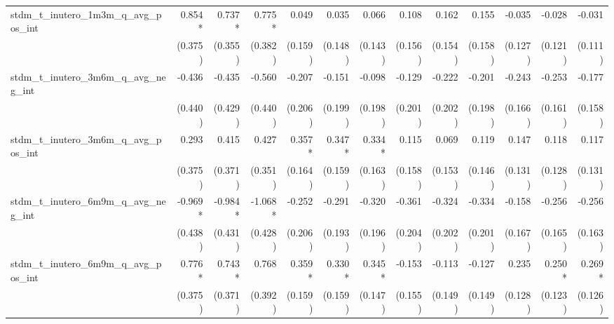 \begin{tabular}{lrrrrrrrrrrrr}
stdm\_t\_inutero\_1m3m\_q\_avg\_pos\_int    &       0.854* &       0.737* &       0.775* &        0.049 &        0.035 &        0.066 &        0.108 &        0.162 &        0.155 &       -0.035 &       -0.028 &       -0.031 \\ 
                                            &      (0.375) &      (0.355) &      (0.382) &      (0.159) &      (0.148) &      (0.143) &      (0.156) &      (0.154) &      (0.158) &      (0.127) &      (0.121) &      (0.111) \\ 
stdm\_t\_inutero\_3m6m\_q\_avg\_neg\_int    &       -0.436 &       -0.435 &       -0.560 &       -0.207 &       -0.151 &       -0.098 &       -0.129 &       -0.222 &       -0.201 &       -0.243 &       -0.253 &       -0.177 \\ 
                                            &      (0.440) &      (0.429) &      (0.440) &      (0.206) &      (0.199) &      (0.198) &      (0.201) &      (0.202) &      (0.198) &      (0.166) &      (0.161) &      (0.158) \\ 
stdm\_t\_inutero\_3m6m\_q\_avg\_pos\_int    &        0.293 &        0.415 &        0.427 &       0.357* &       0.347* &       0.334* &        0.115 &        0.069 &        0.119 &        0.147 &        0.118 &        0.117 \\ 
                                            &      (0.375) &      (0.371) &      (0.351) &      (0.164) &      (0.159) &      (0.163) &      (0.158) &      (0.153) &      (0.146) &      (0.131) &      (0.128) &      (0.131) \\ 
stdm\_t\_inutero\_6m9m\_q\_avg\_neg\_int    &      -0.969* &      -0.984* &      -1.068* &       -0.252 &       -0.291 &       -0.320 &       -0.361 &       -0.324 &       -0.334 &       -0.158 &       -0.256 &       -0.256 \\ 
                                            &      (0.438) &      (0.431) &      (0.428) &      (0.206) &      (0.193) &      (0.196) &      (0.204) &      (0.202) &      (0.201) &      (0.167) &      (0.165) &      (0.163) \\ 
stdm\_t\_inutero\_6m9m\_q\_avg\_pos\_int    &       0.776* &       0.743* &        0.768 &       0.359* &       0.330* &       0.345* &       -0.153 &       -0.113 &       -0.127 &        0.235 &       0.250* &       0.269* \\ 
                                            &      (0.375) &      (0.371) &      (0.392) &      (0.159) &      (0.159) &      (0.147) &      (0.155) &      (0.149) &      (0.149) &      (0.128) &      (0.123) &      (0.126) \\ 

\end{tabular}
